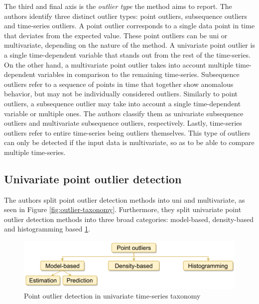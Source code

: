 The third and final axis is the \textit{outlier type} the method aims to report. The authors identify three distinct outlier types: point outliers, subsequence outliers and time-series outliers. A point outlier corresponds to a single data point in time that deviates from the expected value. These point outliers can be uni or multivariate, depending on the nature of the method. A univariate point outlier is a single time-dependent variable that stands out from the rest of the time-series. On the other hand, a multivariate point outlier takes into account multiple time-dependent variables in comparison to the remaining time-series. Subsequence outliers refer to a sequence of points in time that together show anomalous behavior, but may not be individually considered outliers. Similarly to point outliers, a subsequence outlier may take into account a single time-dependent variable or multiple ones. The authors classify them as univariate subsequence outliers and multivariate subsequence outliers, respectively. Lastly, time-series outliers refer to entire time-series being outliers themselves. This type of outliers can only be detected if the input data is multivariate, so as to be able to compare multiple time-series.

\subsection{Univariate point outlier detection}

The authors split point outlier detection methods into uni and multivariate, as seen in Figure \ref{fig:outlier-taxonomy}. Furthermore, they split univariate point outlier detection methods into three broad categories: model-based, density-based and histogramming based \ref{fig:point-outlier-taxonomy}.

\begin{figure}[!htb]
  \begin{center}
    \includegraphics[scale=1]{figures/taxonomy-point-outlier-uni.png}
    \caption{Point outlier detection in univariate time-series taxonomy}
    \label{fig:point-outlier-taxonomy}
  \end{center}
\end{figure}

